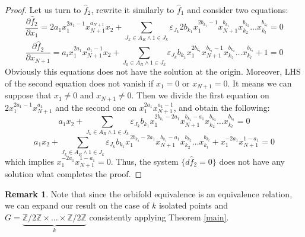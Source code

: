\documentclass[reqno,12pt]{amsart}
\numberwithin{equation}{section}
\theoremstyle{plain}
\theoremstyle{definition}
\newtheorem{remark}[theorem]{Remark}
\newcommand{\ZZ}{{\mathbb{Z}}}
\begin{document}
\begin{proof}
Let us turn to $\hat{f}_2$, rewrite it similarly to $\hat{f}_1$ and consider two equations:
\[
\frac{\partial \hat{f}_2}{\partial x_1} = 2a_1x_1^{2a_1-1}x_{N+1}^{a_{N+1}}x_{2} + \sum_{J_k \in A_R \wedge 1 \in J_k} \varepsilon_{J_k}2b_{k_1}x_1^{2b_{k_1}-1}x_{N+1}^{b_{k_1}}x_{k_2}^{b_{k_2}} \dots x_{k_l}^{b_{k_l}} = 0
\]
\[
\frac{\partial \hat{f}_2}{\partial x_{N+1}} = a_ix_1^{2a_1}x_{N+1}^{a_1-1}x_{2} + \sum_{J_k \in A_R \wedge 1 \in J_k} \varepsilon_{J_k}b_{k_1}x_1^{2b_{k_1}}x_{N+1}^{b_{k_1}-1}x_{k_2}^{b_{k_2}} \dots x_{k_l}^{b_{k_l}} + 1 = 0
\]
Obviously this equations does not have the solution at the origin. Moreover, LHS of the second equation does not vanish if $x_1=0$ or $x_{N+1}=0$. It means we can suppose that $x_1\neq 0$ and $x_{N+1} \neq 0$. Then we divide the first equation on $2x_1^{2a_1-1}x_{N+1}^{a_1}$ and the second one on $x_1^{2a_1}x_{N+1}^{a_1-1}$, and obtain the following:
\[
a_1x_{2} + \sum_{J_k \in A_R \wedge 1 \in J_k} \varepsilon_{J_k}b_{k_1}x_1^{2b_{k_1}-2a_1}x_{N+1}^{b_{k_1}-a_1}x_{k_2}^{b_{k_2}} \dots x_{k_l}^{b_{k_l}} = 0
\]
\[
a_1x_{2} + \sum_{J_k \in A_R \wedge 1 \in J_k} \varepsilon_{J_k} b_{k_1}x_1^{2b_{k_1}-2a_1}x_{N+1}^{b_{k_1}-a_1}x_{k_2}^{b_{k_2}} \dots x_{k_l}^{b_{k_l}} + x_1^{-2a_1}x_{N+1}^{1-a_1} = 0
\]
which implies $x_1^{-2a_1}x_{N+1}^{1-a_1} = 0$. Thus, the system $\{d\hat{f}_2 = 0\}$ does not have any solution what completes the proof.
\end{proof}
\begin{remark}
    Note that since the orbifold equivalence is an equivalence relation, we can expand our result on the case of $k$ isolated points and $G = \underbrace{\ZZ/2\ZZ\times \dots \times \ZZ/2\ZZ}_{k}$ consistently applying Theorem \ref{main}.
\end{remark}
\end{document}

